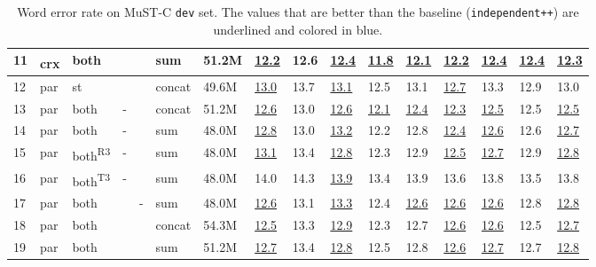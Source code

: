 \documentclass[11pt]{article}
\theoremstyle{plain}
\theoremstyle{definition}
\newcommand{\var}[1]{\texttt{#1}}
\newcommand{\highlight}[1]{{\color{HighlightColor}\underline{#1}}}
\begin{document}
\begin{table}[!htb]
{\begin{tabular}{l | lll ll | l | lll lll ll | l }
	11 & crx\textsuperscript{} & both & \checkmark & \checkmark & sum& 51.2M & \highlight{12.2}& 12.6& \highlight{12.4}& \highlight{11.8}& \highlight{12.1}& \highlight{12.2}& \highlight{12.4}& \highlight{12.4}& \highlight{12.3}\\
	\midrule
	12 & par & st & \checkmark & \checkmark & concat & 49.6M & \highlight{13.0}& 13.7& \highlight{13.1}& 12.5& 13.1& \highlight{12.7}& 13.3& 12.9& 13.0\\
	13 & par & both & - & \checkmark & concat & 51.2M & \highlight{12.6}& 13.0& \highlight{12.6}& \highlight{12.1}& \highlight{12.4}& \highlight{12.3}& \highlight{12.5}& 12.5& \highlight{12.5}\\
	14 & par & both & - & \checkmark & sum & 48.0M & \highlight{12.8}& 13.0& \highlight{13.2}& 12.2& 12.8& \highlight{12.4}& \highlight{12.6}& 12.6& \highlight{12.7}\\
	15 & par & both\textsuperscript{R3} & - & \checkmark & sum & 48.0M & \highlight{13.1}& 13.4& \highlight{12.8}& 12.3& 12.9& \highlight{12.5}& \highlight{12.7}& 12.9& \highlight{12.8}\\
	16 & par & both\textsuperscript{T3} & - & \checkmark & sum & 48.0M & 14.0& 14.3& \highlight{13.9}& 13.4& 13.9& 13.6& 13.8& 13.5& 13.8\\
	17 & par & both & \checkmark & - & sum & 48.0M & \highlight{12.6}& 13.1& \highlight{13.3}& 12.4& \highlight{12.6}& \highlight{12.6}& \highlight{12.6}& 12.8& \highlight{12.8}\\
	18 & par & both & \checkmark & \checkmark & concat & 54.3M & \highlight{12.5}& 13.3& \highlight{12.9}& 12.3& 12.7& \highlight{12.6}& \highlight{12.6}& 12.5& \highlight{12.7}\\
	19 & par & both & \checkmark & \checkmark & sum & 51.2M &\highlight{12.7}& 13.4& \highlight{12.8}& 12.5& 12.8& \highlight{12.6}& \highlight{12.7}& 12.7& \highlight{12.8}\\
	\bottomrule
	\end{tabular}
    }
    \caption{Word error rate on MuST-C \texttt{dev} set. {The values that are better than the baseline (\var{independent++}) are underlined and colored in blue.}}
    \label{tbl:wer_dev_bs}
\end{table}
\end{document}
